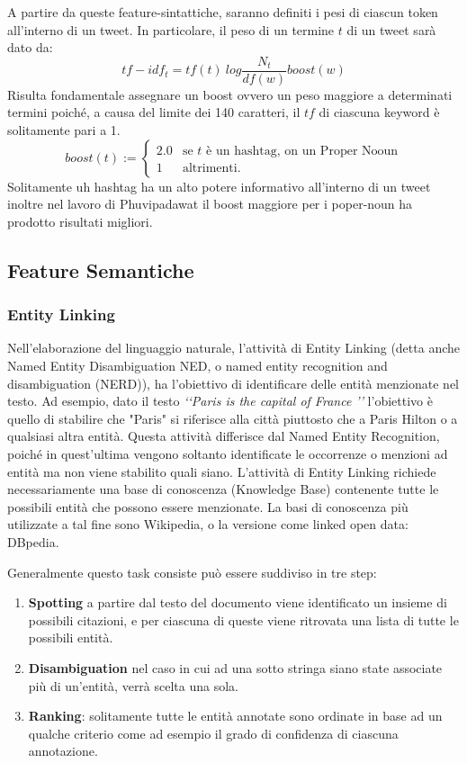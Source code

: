 A partire da queste feature-sintattiche, saranno definiti i pesi di ciascun token all'interno di un tweet.
In particolare, il peso di un termine $t$ di un tweet sarà dato da:
\begin{equation}
tf-idf_t=tf(t)\ log\frac{N_t}{df(w)}boost(w)
\end{equation}
 Risulta fondamentale assegnare un boost ovvero un peso maggiore a determinati termini poiché, a causa del limite dei 140 caratteri, il $tf$ di ciascuna keyword è solitamente pari a 1. 
\begin{equation*}
boost(t):=\begin{cases}
2.0 & \text{se $t$ è un hashtag, on un Proper Nooun}\\
1& \text{altrimenti.}
\end{cases}
\end{equation*}
Solitamente uh hashtag ha un alto potere informativo all'interno di un tweet inoltre nel lavoro di  Phuvipadawat \cite{Phuvipadawat:2010:BND:1913791.1913911}  il boost maggiore per i poper-noun ha prodotto risultati migliori.





\subsection{Feature Semantiche}
\subsubsection{Entity Linking} 
Nell'elaborazione del linguaggio naturale, l'attività di Entity Linking (detta anche Named Entity Disambiguation NED, o named entity recognition and disambiguation (NERD)), ha l'obiettivo di identificare delle entità menzionate nel testo. Ad esempio, dato il testo \emph{\lq\lq Paris is the capital of France \rq \rq} l'obiettivo è quello di stabilire che   "Paris" si riferisce alla città piuttosto che a Paris Hilton o a qualsiasi altra entità.
Questa attività differisce dal Named Entity Recognition, poiché in quest'ultima vengono soltanto identificate le occorrenze o menzioni ad entità ma non viene stabilito quali siano.
L'attività di Entity Linking richiede necessariamente una base di conoscenza (Knowledge Base) contenente tutte le possibili entità che possono essere menzionate. La basi di conoscenza più utilizzate a tal fine sono  Wikipedia, o la versione come linked open data: DBpedia.

Generalmente questo task consiste può essere suddiviso in tre step:
\begin{enumerate}
\item \textbf{Spotting} a partire dal testo del documento viene identificato un insieme di possibili citazioni, e per ciascuna di queste viene ritrovata una lista di tutte le possibili entità.
\item \textbf{Disambiguation} nel caso in cui ad una sotto stringa siano state associate più di un'entità, verrà scelta una sola.
\item \textbf{Ranking}: solitamente tutte  le entità annotate sono ordinate in base ad un qualche criterio come ad esempio il grado di confidenza di ciascuna annotazione.
\end{enumerate}


